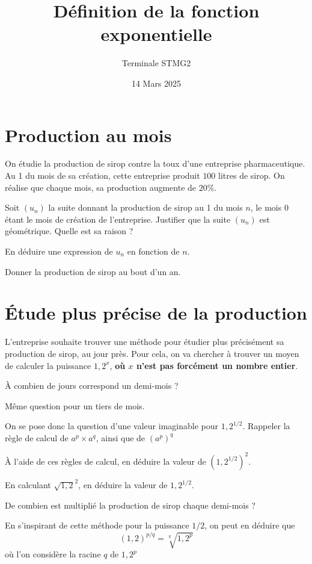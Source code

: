\documentclass{article}
\author{Terminale STMG2}
\title{Définition de la fonction exponentielle}
\date{14 Mars 2025}
\begin{document}
\maketitle

\section{Production au mois}
On étudie la production de sirop contre la toux d'une entreprise pharmaceutique. Au 1\ier{} du mois de sa création, cette entreprise produit $100$ litres de sirop. On réalise que chaque mois, sa production augmente de $20\%$.
\begin{enumquestions}
\item Soit $(u_n)$ la suite donnant la production de sirop au 1\ier{} du mois $n$, le mois $0$ étant le mois de création de l'entreprise. Justifier que la suite $(u_n)$ est géométrique. Quelle est sa raison ?
\item En déduire une expression de $u_n$ en fonction de $n$.
\item Donner la production de sirop au bout d'un an.
\end{enumquestions}

\section{Étude plus précise de la production}

L'entreprise souhaite trouver une méthode pour étudier plus précisément sa production de sirop, au jour près. Pour cela, on va chercher à trouver un moyen de calculer la puissance $1,2^x$, \textbf{où $x$ n'est pas forcément un nombre entier}.
\begin{enumquestions}
\item À combien de jours correspond un demi-mois ? 
\item Même question pour un tiers de mois.
\item On se pose donc la question d'une valeur imaginable pour $1,2^{1/2}$. Rappeler la règle de calcul de $a^p \times a^q$, ainsi que de $(a^p)^q$
\item À l'aide de ces règles de calcul, en déduire la valeur de $(1,2^{1/2})^2$.
\item En calculant $\sqrt{1,2}^2$, en déduire la valeur de $1,2^{1/2}$.
\item De combien est multiplié la production de sirop chaque demi-mois ?    
\end{enumquestions}

En s'inspirant de cette méthode pour la puissance $1/2$, on peut en déduire que 
\begin{equation*}
(1,2)^{p/q} = \sqrt[q]{1,2^p}
\end{equation*}
où l'on considère la racine $q$\ieme{} de $1,2^p$
\end{document}
